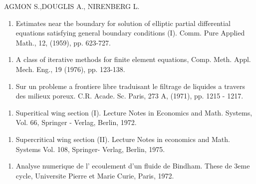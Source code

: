 
\begin{thebibliography}{99}

 {AGMON S.,\pageoriginale DOUGLIS A., NIRENBERG L.}

  \begin{enumerate}
  \item Estimates near the boundary for solution of elliptic partial
 differential equations satisfying general boundary conditions
 (I). Comm. Pure Applied Math., 12, (1959), pp. 623-727.\label{k1:e1}  
  \end{enumerate}


  \begin{enumerate}
  \item A class of iterative methods for finite element equations,
 Comp. Meth. Appl. Mech. Eng., 19 (1976), pp. 123-138.\label{k2:e1} 
  \end{enumerate}


  \begin{enumerate}
  \item Sur un probleme a frontiere libre traduisant le filtrage de
 liquides a travers des milieux poreux. C.R. Acade. Sc. Paris, 273
 A, (1971), pp. 1215 - 1217.\label{k3:e1} 
  \end{enumerate}


  \begin{enumerate}
  \item Superitical wing section (I). Lecture Notes in Economics and
 Math. Systems, Vol. 66, Springer - Verlag, Berlin, 1972.\label{k4:e1}
  \end{enumerate}


  \begin{enumerate}
  \item Supercritical wing section (II). Lecture Notes in economics
 and Math. Systems Vol. 108, Springer- Verlag, Berlin, 1975. \label{k5:e1}
  \end{enumerate}


  \begin{enumerate}
  \item  Analyse numerique de  l' ecoulement d'un fluide de
 Bindham. These de 3eme cycle, Universite Pierre et Marie Curie,
 Paris, 1972.\label{k6:e1} 


\end{enumerate}
\end{thebibliography}

